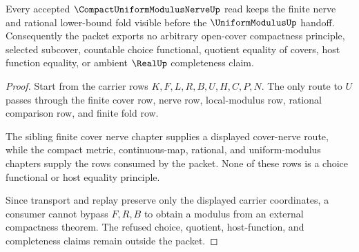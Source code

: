 \begin{theorem}
\label{thm:compact-uniform-modulus-nerve-no-choice-boundary}
Every accepted $\CompactUniformModulusNerveUp$ read keeps the finite nerve and rational lower-bound fold visible before the $\UniformModulusUp$ handoff. Consequently the packet exports no arbitrary open-cover compactness principle, selected subcover, countable choice functional, quotient equality of covers, host function equality, or ambient $\RealUp$ completeness claim.
\end{theorem}
\begin{proof}
Start from the carrier rows $K,F,L,R,B,U,H,C,P,N$. The only route to $U$ passes through the finite cover row, nerve row, local-modulus row, rational comparison row, and finite fold row.

The sibling finite cover nerve chapter supplies a displayed cover-nerve route, while the compact metric, continuous-map, rational, and uniform-modulus chapters supply the rows consumed by the packet. None of these rows is a choice functional or host equality principle.

Since transport and replay preserve only the displayed carrier coordinates, a consumer cannot bypass $F,R,B$ to obtain a modulus from an external compactness theorem. The refused choice, quotient, host-function, and completeness claims remain outside the packet.
\end{proof}


\begin{closurestatus}{\CompactUniformModulusNerveUp}
  \theoryclosure{\seedClosure}
  \formalstatus{\unformalizedV}
\end{closurestatus}
